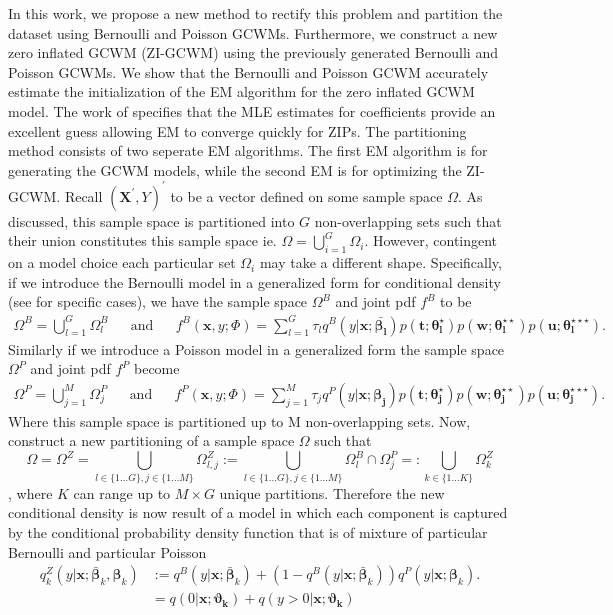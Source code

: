 \documentclass[11pt,letterpaper]{article}
\numberwithin{equation}{section}
\numberwithin{equation}{section}
\numberwithin{equation}{section}
\begin{document}
	In this work, we propose a new method to rectify this problem and partition the dataset using Bernoulli and Poisson GCWMs. Furthermore, we construct a new zero inflated GCWM (ZI-GCWM) using the previously generated Bernoulli and Poisson GCWMs. We show that the Bernoulli and Poisson GCWM accurately estimate the initialization of the EM algorithm for the zero inflated GCWM model. The work of \cite{Lambert} specifies that the MLE estimates for coefficients provide an excellent guess allowing EM to converge quickly for ZIPs. The partitioning method consists of two seperate EM algorithms. The first EM algorithm is for generating the GCWM models, while the second EM is for optimizing the ZI-GCWM. Recall $(\bm {X^{'}}, Y)^{'}$ to be a vector defined on some sample space $\Omega$. As discussed, this sample space is partitioned into $G$ non-overlapping sets such that their union constitutes this sample space ie. $ \Omega = \bigcup_{i=1}^G \Omega_i $.  However, contingent on a model choice each particular set $\Omega_i$ may take a different shape. 
	 Specifically, if we introduce the Bernoulli model in a generalized form for conditional density (see \cite{Ingrassia+Punzo+Vittadini+Minotti:2015} for specific cases), we have the sample space $\Omega^B$ and joint pdf $f^B$ to be \begin{align*} 
\Omega^B =  \bigcup_{l =1}^G \Omega_l^B & & \text{and} &  &
f^B(\bm x, y; \Phi)= \sum_{l=1}^{G} \tau_l q^B(y|\bm{x}; \bm{\bar{\beta_l}}) p(\bm{t};\bm{\theta_l^{\star}})p(\bm{w};\bm{\theta_l^{\star\star}})p(\bm{u};\bm{\theta_l^{\star\star\star}}). 
\end{align*} 
Similarly if we introduce a Poisson model in a generalized form the sample space $\Omega^P$ and joint pdf $f^P$ become
\begin{align*}
\Omega^P =  \bigcup_{j =1}^M \Omega_j^P & & \text{and} &  &
f^P(\bm x, y; \Phi)= \sum_{j=1}^{M} \tau_j q^P(y|\bm{x};\bm{\beta_{j}}) p(\bm{t};\bm{\theta_j^{\star}})p(\bm{w};\bm{\theta_j^{\star\star}})p(\bm{u};\bm{\theta_j^{\star\star\star}}).  
\end{align*}
Where this sample space is partitioned up to M non-overlapping sets. 
 Now, construct a new partitioning of a sample space $\Omega$ such that 
$$\Omega =  \Omega^Z = \bigcup_{l \in \{1 \ldots G \} , j \in \{1 \ldots M \}  } \Omega_{l,j}^Z := \bigcup_{l \in \{1 \ldots G \} , j \in \{1 \ldots M \}  }  \Omega_l^B \cap \Omega_j^P =: \bigcup_{k \in \{1 \ldots K \}} \Omega_k^Z $$, where $K$ can range up to $M \times G$ unique partitions. Therefore the new conditional density  is now result of a model in which each component is captured by the conditional probability density function that is of mixture of particular Bernoulli and particular Poisson
\begin{align} 
q^Z_{k}(y|\bm{x};  \bm{\bar{\beta}}_k,\bm{ \beta}_k) & := q^B(y|\bm{x}; \bm{\bar{\beta}}_k) +(1-  q^B(y|\bm{x}; \bm{\bar{\beta}}_k) ) q^P(y|\bm{x};\bm{\beta}_k).
\label{initialziGCWM}\\ 
& = q(0|\bm{x};\bm{\vartheta_{k} }) +  q(y > 0|\bm{x} ; \bm{\vartheta_{k}})
\label{ziGCWM} 
\end{align}
\end{document}
